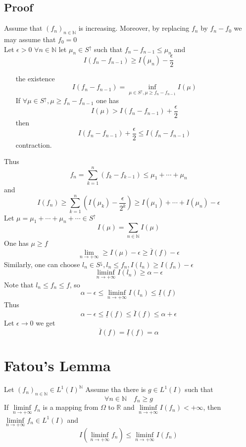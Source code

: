 \documentclass{book}
\begin{document}
\subsection*{Proof}
Assume that $(f_n)_{n\in \mathbb{N}}$ is increasing. Moreover, by replacing $f_n$ by $f_n-f_0$ we may assume that $f_0=0$\\
Let $\epsilon>0$ $\forall n\in\mathbb{N}$ let $\mu_n\in S^\uparrow$ such that $f_n-f_{n-1}\leq\mu_n$ and $$I(f_n-f_{n-1})\geq I(\mu_n)-\frac{\epsilon}2$$
\begin{itemize}
    \item[the existence]
    $$I(f_n-f_{n-1})=\inf\limits_{\mu\in S^\uparrow,\mu\geq f_n-f_{n-1}}I(\mu)$$
    If $\forall \mu\in S^\uparrow,\mu\geq f_n-f_{n-1}$ one has $$I(\mu)>I(f_n-f_{n-1})+\frac{\epsilon}2$$
    then $$I(f_n-f_{n-1})+\frac{\epsilon}{2}\leq I(f_n-f_{n-1})$$ contraction.
\end{itemize}
Thus $$f_n=\sum\limits_{k=1}^{n}(f_k-f_{k-1})\leq\mu_1+\cdots+\mu_n$$
and 
$$I(f_n)\geq\sum\limits_{k=1}^{n}(I(\mu_k)-\frac{\epsilon}{2^k})\geq I(\mu_1)+\cdots+I(\mu_n)-\epsilon$$
Let $\mu=\mu_1+\cdots+\mu_n+\cdots\in S^\uparrow$$$I(\mu)=\sum\limits_{n\in \mathbb{N}}I(\mu)$$
One has $\mu\geq f$
$$\lim\limits_{n\rightarrow+\infty}\geq I(\mu)-\epsilon\geq \overline{I}(f)-\epsilon$$
Similarly, one can choose $l_n\in S^\downarrow,l_n\leq f_n,I(l_n)\geq I(f_n)-\epsilon$
$$\liminf\limits_{n\rightarrow+\infty} I(l_n)\geq\alpha-\epsilon$$
Note that $l_n\leq f_n\leq f$, so $$\alpha-\epsilon\leq\liminf\limits_{n\rightarrow+\infty}I(l_n)\leq\underline{I}(f)$$
Thus 
$$\alpha-\epsilon\leq \underline{I}(f)\leq\overline{I}(f)\leq\alpha+\epsilon$$
Let $\epsilon\rightarrow 0$ we get 
$$\overline{I}(f)=\underline{I}(f)=\alpha$$
\section{Fatou's Lemma}
Let $(f_n)_{n\in \mathbb{N}}\in L^1(I)^\mathbb{N}$ Assume tha there is $g\in L^1(I)$ such that $$\forall n\in \mathbb{N}\quad f_n\geq g$$
If $\liminf\limits_{n\rightarrow+\infty}f_n$ is a mapping from $\Omega$ to $\mathbb{R}$ and $\liminf\limits_{n\rightarrow+\infty}I(f_n)<+\infty$, then $\liminf\limits_{n\rightarrow+\infty}f_n\in L^1(I)$ and $$I(\liminf\limits_{n\rightarrow+\infty}f_n)\leq\liminf\limits_{n\rightarrow+\infty}I(f_n)$$
\end{document}
